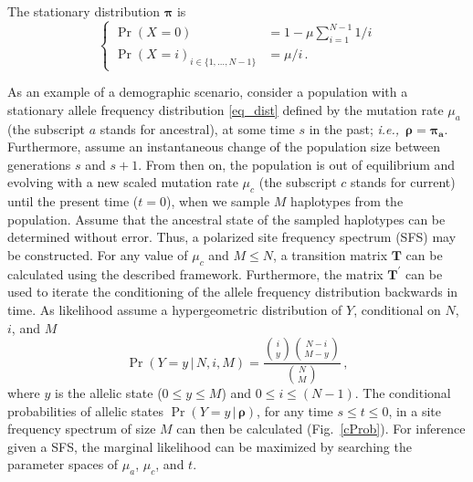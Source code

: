 \documentclass[preprint]{elsarticle}
\newcommand{\bs}[1]{\ensuremath{\boldsymbol{#1}}}
\newcommand\given{{\,|\,}}
\newcommand\ie{{\it i.e.,}}
\newcommand\x[1]{\ensuremath{X_{#1}}}
\newcommand\y{\ensuremath{Y}}
\begin{document}
The stationary distribution $\bs{\pi}$ is 
\begin{equation}\label{eq_dist}
\begin{cases}
\Pr(\x{}=0)&=1-\mu\sum_{i=1}^{N-1}1/i\\
\Pr(\x{}=i)_{i \in \{1, \ldots, N-1\}} &=\mu/i\,.
\end{cases}
\end{equation}

As an example of a demographic scenario, consider a population with a stationary allele frequency distribution \eqref{eq_dist} defined by the mutation rate $\mu_a$ (the subscript $a$ stands for ancestral), at some time $s$ in the past; \ie\ $\bs{\rho} = \bs{\pi_a}$. Furthermore, assume an instantaneous change of the population size between generations $s$ and $s+1$. From then on, the population is out of equilibrium and evolving with a new scaled mutation rate $\mu_c$ (the subscript $c$ stands for current) until the present time ($t=0$), when we sample $M$ haplotypes from the population. Assume that the ancestral state of the sampled haplotypes can be determined without error. Thus, a polarized site frequency spectrum (SFS) may be constructed. For any value of $\mu_c$ and $M \leq N$, a transition matrix $\mathbf{T}$ can be calculated using the described framework. Furthermore, the matrix $\mathbf{T}^{'}$ can be used to iterate the conditioning of the allele frequency distribution backwards in time. As likelihood assume a hypergeometric distribution of $Y$, conditional on $N$, $i$, and $M$
\begin{equation}\label{X0}
\Pr(\y=y\given N,i,M)=\frac{\binom{i}{y}\binom{N-i}{M-y}}{\binom{N}{M}}\,,
\end{equation}
where $y$ is the allelic state ($0\leq y\leq M$) and $0\leq i\leq (N-1)$. The conditional probabilities of allelic states $\Pr(Y = y \given \bs{\rho})$, for any time $s\leq t\leq 0$, in a site frequency spectrum of size $M$ can then be calculated (Fig.~\ref{cProb}). For inference given a SFS, the marginal likelihood can be maximized by searching the parameter spaces of $\mu_a$, $\mu_c$, and $t$.
\end{document}

